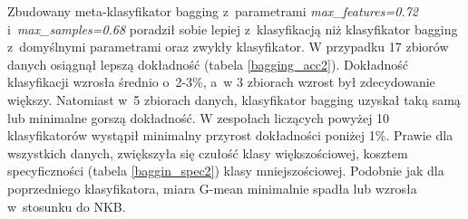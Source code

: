 Zbudowany meta-klasyfikator bagging z~parametrami \textit{max\_features=0.72} i~\textit{max\_samples=0.68} poradził sobie lepiej z~klasyfikacją niż klasyfikator bagging z~domyślnymi parametrami oraz zwykły klasyfikator. W przypadku 17 zbiorów danych osiągnął lepszą dokładność (tabela \ref{bagging_acc2}). Dokładność klasyfikacji wzrosła średnio o~2-3\%, a~w 3 zbiorach wzrost był zdecydowanie większy. Natomiast w~5 zbiorach danych, klasyfikator bagging uzyskał taką samą lub minimalne gorszą dokładność. W zespołach liczących powyżej 10 klasyfikatorów wystąpił minimalny przyrost dokładności poniżej 1\%. Prawie dla wszystkich danych, zwiększyła się czułość klasy większościowej, kosztem specyficzności (tabela \ref{baggin_spec2}) klasy mniejszościowej. Podobnie jak dla poprzedniego klasyfikatora, miara G-mean minimalnie spadła lub wzrosła w~stosunku do NKB.
\begin{table}[H]
	\tiny
	\begin{center}
\end{center}
\end{table}
